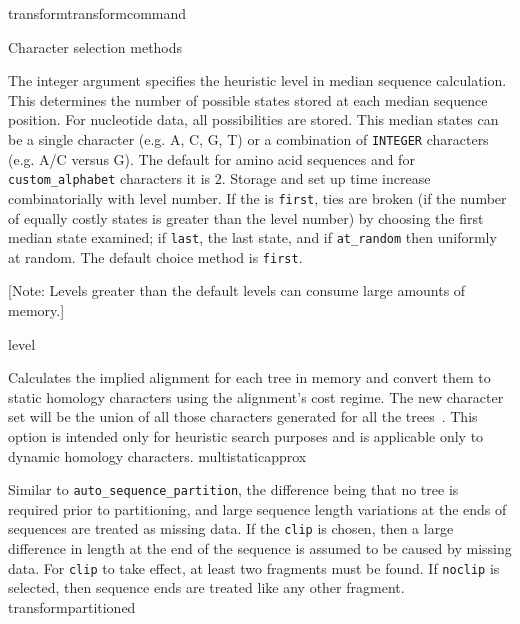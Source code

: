 \begin{command}{transform}{transformcommand}
\begin{arguments}
\begin{argumentgroup}{Character selection methods}
                {The integer argument specifies the heuristic level in median sequence calculation.  
                This determines the number of possible states stored at each median sequence position.  
                For nucleotide data, all possibilities are stored.  This median states can be a single character 
                (e.g. A, C, G, T) or a combination of \texttt{INTEGER}  characters (e.g. A/C versus G).
                The default for amino acid sequences and for \texttt{custom\_alphabet} characters 
                it is $2$.  Storage and set up time increase combinatorially with level number. 
                If the \poylident is \texttt{first}, ties are broken (if the number of equally costly states 
                is greater than the level number) by choosing the first median state examined; 
                if \texttt{last}, the last state, and if \texttt{at\_random} then uniformly at  random.
                The default choice method is \texttt{first}.
                
               [Note: Levels greater than the default levels can consume large amounts of memory.] }
                {level}
                    
                {Calculates the implied alignment for each tree in memory
                and convert them to static homology characters using the alignment's
                cost regime. The new character set will be the union of all those
                characters generated for all the trees~\cite{wheeler1995a}. This option is intended only
                for heuristic search purposes and is applicable only to dynamic homology characters.}
                {multistaticapprox}

                {Similar to \texttt{auto\_sequence\_partition}, the difference being that no tree is
                required prior to partitioning, and large sequence length variations
                at the ends of sequences are treated as missing data. If the \poylident \texttt{clip} 
                is chosen, then a large difference in length at the end of the sequence is assumed to be caused by
                missing data. For \texttt{clip} to take effect, at least two fragments must
                be found. If \poylident \texttt{noclip} is selected, then sequence ends are treated like
                any other fragment.}
                {transformpartitioned}
            

\end{argumentgroup}
\end{arguments}
\end{command}
